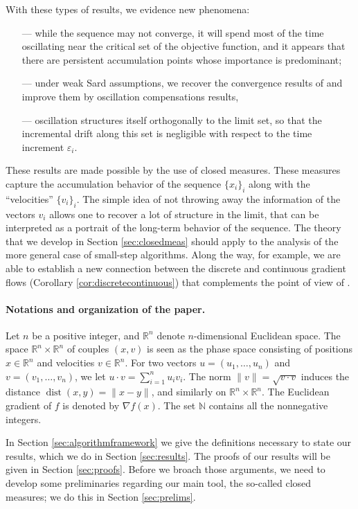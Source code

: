 \documentclass[11pt]{article}
\theoremstyle{definition}
\theoremstyle{remark}
\DeclareMathOperator{\dist}{dist}
\newcommand{\R}{\mathbb{R}}
\newcommand{\N}{\mathbb{N}}
\begin{document}
With these types of results, we evidence new phenomena:
\begin{itemize}
\item[---] while the sequence may not converge, it will spend most of the time oscillating near the critical set of the objective function, and it appears that there are persistent accumulation points whose importance is predominant;
\item[---] under weak Sard assumptions, we recover the convergence results of \cite{Davis2019} and improve them by  oscillation compensations results,
\item[---] oscillation structures itself orthogonally to the limit set, so that the incremental drift along this set is negligible with respect to the time increment $\varepsilon_i$.
\end{itemize}

%
%
%

These results are made possible by the use of closed measures. These measures capture the accumulation behavior of the sequence $\{x_i\}_i$ along with the ``velocities'' $\{v_i\}_i$. The simple idea of not throwing away the information of the vectors $v_i$ allows one to recover a lot of structure in the limit, that can be interpreted as a portrait of the long-term behavior of the sequence. The theory that we develop in Section \ref{sec:closedmeas} should apply to the analysis of the more general case of small-step algorithms. Along the way, for example, we are able to establish a new connection between the discrete and continuous gradient flows (Corollary \ref{cor:discretecontinuous}) that complements the point of view of \cite{BHS}.

\paragraph{Notations and organization of the paper.} Let $n$ be a positive integer, and $\R^n$ denote $n$-dimensional Euclidean space. The space $\R^n\times\R^n$ of couples $(x,v)$ is seen as the phase space consisting of positions $x\in \R^n$ and velocities $v\in \R^n$. For two vectors $u=(u_1,\dots,u_n)$ and $v=(v_1,\dots,v_n)$, we let $u\cdot v=\sum_{i=1}^nu_iv_i$. The norm $\|v\|=\sqrt{v\cdot v}$ induces the distance $\dist(x,y)=\|x-y\|$, and similarly on $\R^n\times\R^n$. The Euclidean gradient of $f$ is denoted by $\nabla f(x)$. The set $\N$ contains all the nonnegative integers.%



In Section \ref{sec:algorithmframework} we give the definitions necessary to state our results, which we do in Section \ref{sec:results}. 
The proofs of our results will be given in Section \ref{sec:proofs}. Before we broach those arguments, we need to develop some preliminaries regarding our main tool, the so-called closed measures; we do this in Section \ref{sec:prelims}. %
\end{document}
